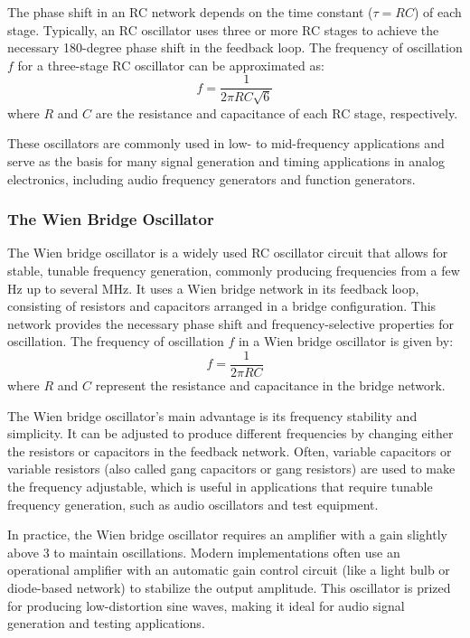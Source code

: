 \documentclass[12pt,a4paper]{article}
\begin{document}
    The phase shift in an RC network depends on the time constant (\( \tau = RC \)) of each stage. Typically, an RC oscillator uses three or more RC stages to achieve the necessary 180-degree phase shift in the feedback loop. The frequency of oscillation \( f \) for a three-stage RC oscillator can be approximated as:
    \[
    f = \frac{1}{2 \pi R C \sqrt{6}}
    \]
    where \( R \) and \( C \) are the resistance and capacitance of each RC stage, respectively.

    These oscillators are commonly used in low- to mid-frequency applications and serve as the basis for many signal generation and timing applications in analog electronics, including audio frequency generators and function generators.

    \subsubsection{The Wien Bridge Oscillator}
    The Wien bridge oscillator is a widely used RC oscillator circuit that allows for stable, tunable frequency generation, commonly producing frequencies from a few Hz up to several MHz. It uses a Wien bridge network in its feedback loop, consisting of resistors and capacitors arranged in a bridge configuration. This network provides the necessary phase shift and frequency-selective properties for oscillation. The frequency of oscillation \( f \) in a Wien bridge oscillator is given by:
    \[
    f = \frac{1}{2 \pi R C}
    \]
    where \( R \) and \( C \) represent the resistance and capacitance in the bridge network.

    The Wien bridge oscillator’s main advantage is its frequency stability and simplicity. It can be adjusted to produce different frequencies by changing either the resistors or capacitors in the feedback network. Often, variable capacitors or variable resistors (also called gang capacitors or gang resistors) are used to make the frequency adjustable, which is useful in applications that require tunable frequency generation, such as audio oscillators and test equipment.

    In practice, the Wien bridge oscillator requires an amplifier with a gain slightly above 3 to maintain oscillations. Modern implementations often use an operational amplifier with an automatic gain control circuit (like a light bulb or diode-based network) to stabilize the output amplitude. This oscillator is prized for producing low-distortion sine waves, making it ideal for audio signal generation and testing applications.
\end{document}
